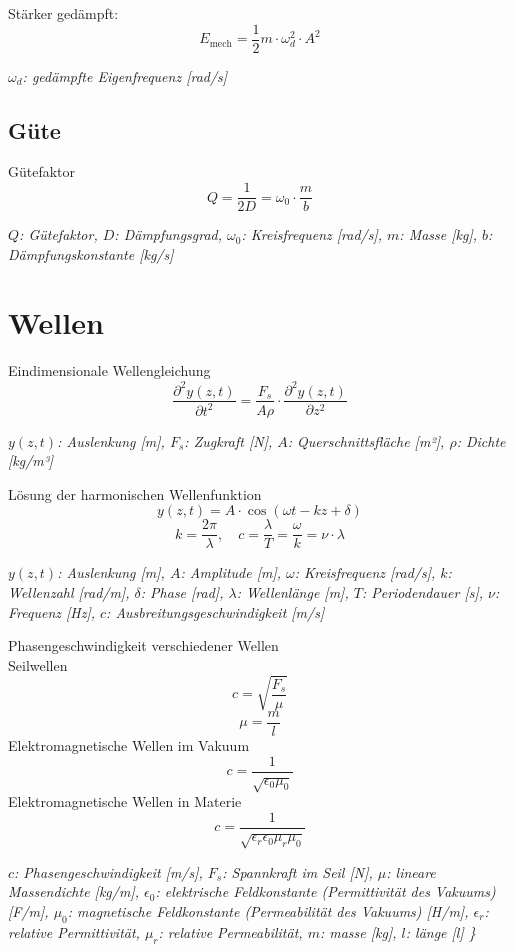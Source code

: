 \documentclass[a4paper,10pt]{article}
\newenvironment{displayformula}
{
	\begin{framed}
		\color{formulaColor}
	}
	{\end{framed}}
\newcommand{\formulalegend}[1]{%
	\par\vspace{0.5ex}%
	{{\color{legendColor}\RaggedRight\small\textit{#1}}}%
	\par\vspace{1.5ex}%
}
\begin{document}
\begin{displayformula}
	Stärker gedämpft:
	\[
	E_{\text{mech}} = \frac{1}{2} m \cdot \omega_d^2 \cdot A^2
	\]
\end{displayformula}
\formulalegend{
	\( \omega_d \): gedämpfte Eigenfrequenz [rad/s]
}

\subsection{Güte}

\begin{displayformula}
	Gütefaktor
	\[
	Q = \frac{1}{2D} = \omega_0 \cdot \frac{m}{b}
	\]
\end{displayformula}
\formulalegend{
	\( Q \): Gütefaktor, \( D \): Dämpfungsgrad, \( \omega_0 \): Kreisfrequenz [rad/s], \( m \): Masse [kg], \( b \): Dämpfungskonstante [kg/s]
}

\section{Wellen}

\begin{displayformula}
	Eindimensionale Wellengleichung
	\[
	\frac{\partial^2 y(z,t)}{\partial t^2} = \frac{F_s}{A \rho} \cdot \frac{\partial^2 y(z,t)}{\partial z^2}
	\]
\end{displayformula}
\formulalegend{
	\( y(z,t) \): Auslenkung [m], \( F_s \): Zugkraft [N], \( A \): Querschnittsfläche [m²], \( \rho \): Dichte [kg/m³]
}

\begin{displayformula}
	Lösung der harmonischen Wellenfunktion
	\[
	y(z, t) = A \cdot \cos(\omega t - kz + \delta)
	\]
	\[
	k = \frac{2\pi}{\lambda}, \quad c = \frac{\lambda}{T} = \frac{\omega}{k} = \nu \cdot \lambda
	\]
\end{displayformula}
\formulalegend{
	\( y(z,t) \): Auslenkung [m], \( A \): Amplitude [m], \( \omega \): Kreisfrequenz [rad/s], \( k \): Wellenzahl [rad/m], \( \delta \): Phase [rad], \( \lambda \): Wellenlänge [m], \( T \): Periodendauer [s], \( \nu \): Frequenz [Hz], \( c \): Ausbreitungsgeschwindigkeit [m/s]
}


\begin{displayformula}
	Phasengeschwindigkeit verschiedener Wellen \\ 
	Seilwellen
	\[
	c = \sqrt{\frac{F_s}{\mu}}
	\]
		\[
	\mu = \frac{m}{l}
	\]
	Elektromagnetische Wellen im Vakuum
	\[
	c = \frac{1}{\sqrt{\epsilon_0 \mu_0}}
	\]
	Elektromagnetische Wellen in Materie
	\[
	c = \frac{1}{\sqrt{\epsilon_r \epsilon_0 \mu_r \mu_0}}
	\]
\end{displayformula}
\formulalegend{
	\( c \): Phasengeschwindigkeit [m/s], 
	\( F_s \): Spannkraft im Seil [N], 
	\( \mu \): lineare Massendichte [kg/m], 
	\( \epsilon_0 \): elektrische Feldkonstante (Permittivität des Vakuums) [F/m], 
	\( \mu_0 \): magnetische Feldkonstante (Permeabilität des Vakuums) [H/m], 
	\( \epsilon_r \): relative Permittivität, 
	\( \mu_r \): relative Permeabilität,
	\(m\): masse [kg],
	\(l\): länge [l]
	\}
}
\end{document}
